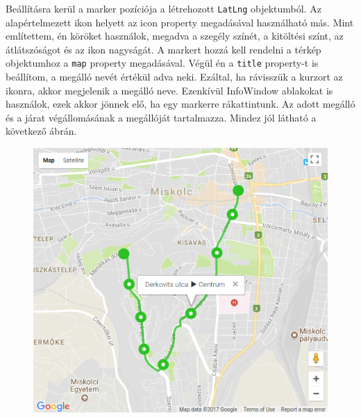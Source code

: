 Beállításra kerül a marker pozíciója a létrehozott \texttt{LatLng} objektumból. Az alapértelmezett ikon helyett az icon property megadásával használható más. Mint említettem, én köröket használok, megadva a szegély színét, a kitöltési színt, az átlátszóságot és az ikon nagyságát. A markert hozzá kell rendelni a térkép objektumhoz a \texttt{map} property megadásával. Végül én a \texttt{title} property-t is beállítom, a megálló nevét értékül adva neki. Ezáltal, ha rávisszük a kurzort az ikonra, akkor megjelenik a megálló neve. Ezenkívül InfoWindow ablakokat is használok, ezek akkor jönnek elő, ha egy markerre rákattintunk. Az adott megálló és a járat végállomásának a megállóját tartalmazza. Mindez jól látható a következő ábrán.

\begin{figure}[h!]
\centering
\includegraphics[scale=0.7]{kepek/terkep.png}
\caption{}
\label{fig:terkep}
\end{figure}
